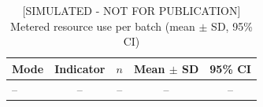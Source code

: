 \begin{table}[t]\centering\footnotesize
\caption{[SIMULATED - NOT FOR PUBLICATION] Metered resource use per batch (mean $\pm$ SD, 95\% CI)}
\label{tab:fieldres}
\begin{tabular}{lcccc}\toprule
Mode & Indicator & $n$ & Mean $\pm$ SD & 95\% CI\\\midrule
-- & -- & -- & -- & --\\
\bottomrule\end{tabular}\end{table}
